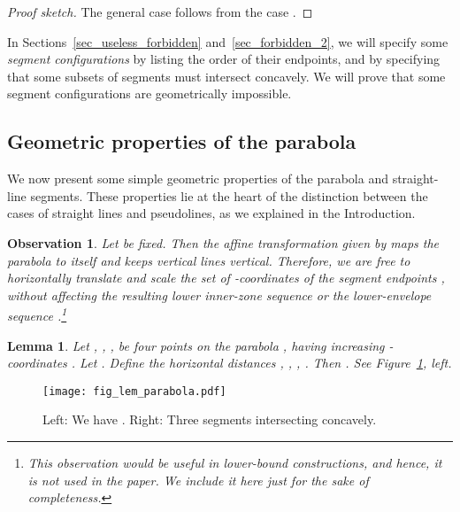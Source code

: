 \documentclass[11pt]{article}
\newtheorem{lemma}[theorem]{Lemma}
\newtheorem{observation}[theorem]{Observation}
\theoremstyle{definition}
\theoremstyle{remark}
\begin{document}
\begin{proof}[Proof sketch]
The general case follows from the case .
\end{proof}

In Sections~\ref{sec_useless_forbidden} and~\ref{sec_forbidden_2}, we will specify some \emph{segment configurations} by listing the order of their endpoints, and by specifying that some subsets of segments must intersect concavely. We will prove that some segment configurations are geometrically impossible.

\subsection{Geometric properties of the parabola}

We now present some simple geometric properties of the parabola  and straight-line segments. These properties lie at the heart of the distinction between the cases of straight lines and pseudolines, as we explained in the Introduction.

\begin{observation}
Let  be fixed. Then the affine transformation  given by  maps the parabola  to itself and keeps vertical lines vertical. Therefore, we are free to horizontally translate and scale the set of -coordinates of the segment endpoints , without affecting the resulting lower inner-zone sequence  or the lower-envelope sequence .\footnote{This observation would be useful in \emph{lower-bound constructions}, and hence, it is not used in the paper. We include it here just for the sake of completeness.}
\end{observation}

\begin{lemma}\label{lem_parabola}
Let , , ,  be four points on the parabola , having increasing -coordinates . Let . Define the horizontal distances , , , . Then . See Figure~\ref{fig_lem_parabola}, left.
\end{lemma}

\begin{figure}
\centerline{\texttt{[image: fig\_lem\_parabola.pdf]}}
\caption{\label{fig_lem_parabola}Left: We have . Right: Three segments intersecting concavely.}
\end{figure}
\end{document}
